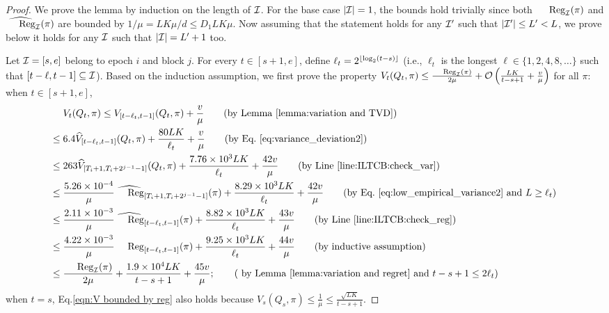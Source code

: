 \begin{proof}
We prove the lemma by induction on the length of ${\mathcal{I}}$.  For the
base case $|{\mathcal{I}}| = 1$, the bounds hold trivially since both
$\Reg_{\calI}(\pi)$ and $\whReg_{\calI}(\pi)$ are bounded by $1/\mu =
LK\mu/d \leq D_1LK\mu$.  Now assuming that the statement holds for any
${\mathcal{I}}'$ such that $|{\mathcal{I}}'| \leq L' < L$, we prove below it holds for
any ${\mathcal{I}}$ such that $|{\mathcal{I}}| = L' + 1$ too.

Let ${\mathcal{I}}=[s,e]$ belong to epoch $i$ and block $j$. For every $t\in [s+1,e]$, define $\ell_t=2^{\lfloor\log_2(t-s)\rfloor}$ (i.e., $\ell_t$ is the longest $\ell\in\{1,2,4,8,\ldots\}$ such that $[t-\ell, t-1]\subseteq{\mathcal{I}}$). Based on the induction assumption, we first prove the property $ V_t(Q_t,\pi)\leq \frac{\Reg_\calI(\pi)}{2\mu} + \order\left(\frac{LK}{t-s+1}+\frac{v}{\mu}\right)$ for all $\pi$: when $t\in[s+1,e]$, 
\begin{align}
& V_t(Q_t,\pi)\leq V_{[t-\ell_t,t-1]}(Q_t,\pi) + \frac{v}{\mu} \tag{by Lemma~\ref{lemma:variation and TVD}} \\
\leq\;& 6.4 \whV_{[t-\ell_t,t-1]}(Q_t, \pi)  + \frac{80 LK}{\ell_t} + \frac{v}{\mu}  \tag{by
    Eq.~\eqref{eq:variance_deviation2}} \\ 
\leq\;& 263 \whV_{[T_i+1, T_i+2^{j-1}-1]}(Q_t, \pi) + \frac{7.76\times 10^3LK}{\ell_t} + \frac{42v}{\mu}  \tag{by Line~\ref{line:ILTCB:check_var}}\\ 
\leq\;& \frac{5.26\times 10^{-4}}{\mu}\whReg_{[T_i+1, T_i+2^{j-1}-1]}(\pi) + \frac{8.29\times 10^3LK}{\ell_t} + \frac{42v}{\mu}\tag{by
  Eq.~\eqref{eq:low_empirical_variance2} and $L \geq \ell_t$}  \\ 
\leq\;& \frac{2.11\times 10^{-3}}{\mu}\whReg_{[t-\ell_t,t-1]}(\pi) +\frac{8.82\times 10^3 LK}{\ell_t} + \frac{43v}{\mu}
\tag{by Line~\ref{line:ILTCB:check_reg}}\\ 
\leq\;& \frac{4.22\times 10^{-3}}{\mu} \Reg_{[t-\ell_t, t-1]}(\pi) + \frac{9.25 \times 10^3LK}{\ell_t} + \frac{44v}{\mu} \tag{by inductive assumption}\\  
\leq\;& \frac{\Reg_\calI(\pi)}{2\mu} + \frac{1.9\times 10^4LK}{t-s+1} + \frac{45v}{\mu}; \tag{
  by Lemma~\ref{lemma:variation and regret} and $t-s+1 \leq 2\ell_t$} \\ \label{eqn:V bounded by reg} 
\end{align}
when $t=s$, Eq.\eqref{eqn:V bounded by reg} also holds because $V_s(Q_s,\pi)\leq \frac{1}{\mu}\leq \frac{\sqrt{LK}}{t-s+1}$.  


\end{proof}
